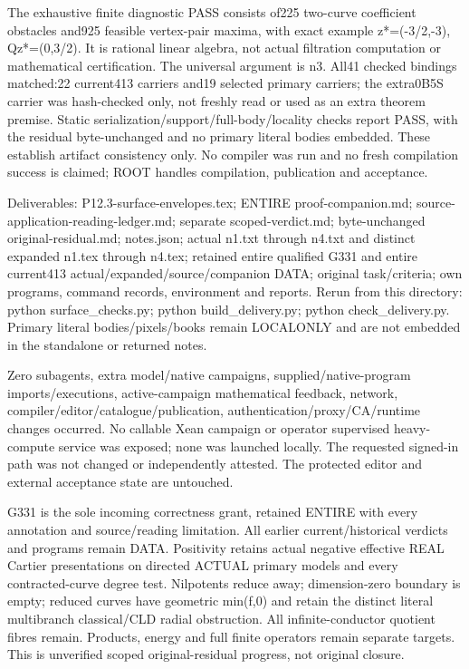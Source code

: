 \documentclass[11pt]{article}
\begin{document}
The exhaustive finite diagnostic PASS consists of225 two-curve coefficient obstacles and925 feasible vertex-pair maxima, with exact example z*=(-3/2,-3), Qz*=(0,3/2). It is rational linear algebra, not actual filtration computation or mathematical certification. The universal argument is n3. All41 checked bindings matched:22 current413 carriers and19 selected primary carriers; the extra0B5S carrier was hash-checked only, not freshly read or used as an extra theorem premise. Static serialization/support/full-body/locality checks report PASS, with the residual byte-unchanged and no primary literal bodies embedded. These establish artifact consistency only. No compiler was run and no fresh compilation success is claimed; ROOT handles compilation, publication and acceptance.

Deliverables: P12.3-surface-envelopes.tex; ENTIRE proof-companion.md; source-application-reading-ledger.md; separate scoped-verdict.md; byte-unchanged original-residual.md; notes.json; actual n1.txt through n4.txt and distinct expanded n1.tex through n4.tex; retained entire qualified G331 and entire current413 actual/expanded/source/companion DATA; original task/criteria; own programs, command records, environment and reports. Rerun from this directory: python surface\_checks.py; python build\_delivery.py; python check\_delivery.py. Primary literal bodies/pixels/books remain LOCALONLY and are not embedded in the standalone or returned notes.

Zero subagents, extra model/native campaigns, supplied/native-program imports/executions, active-campaign mathematical feedback, network, compiler/editor/catalogue/publication, authentication/proxy/CA/runtime changes occurred. No callable Xean campaign or operator supervised heavy-compute service was exposed; none was launched locally. The requested signed-in path was not changed or independently attested. The protected editor and external acceptance state are untouched.

G331 is the sole incoming correctness grant, retained ENTIRE with every annotation and source/reading limitation. All earlier current/historical verdicts and programs remain DATA. Positivity retains actual negative effective REAL Cartier presentations on directed ACTUAL primary models and every contracted-curve degree test. Nilpotents reduce away; dimension-zero boundary is empty; reduced curves have geometric min(f,0) and retain the distinct literal multibranch classical/CLD radial obstruction. All infinite-conductor quotient fibres remain. Products, energy and full finite operators remain separate targets. This is unverified scoped original-residual progress, not original closure.
\end{document}
